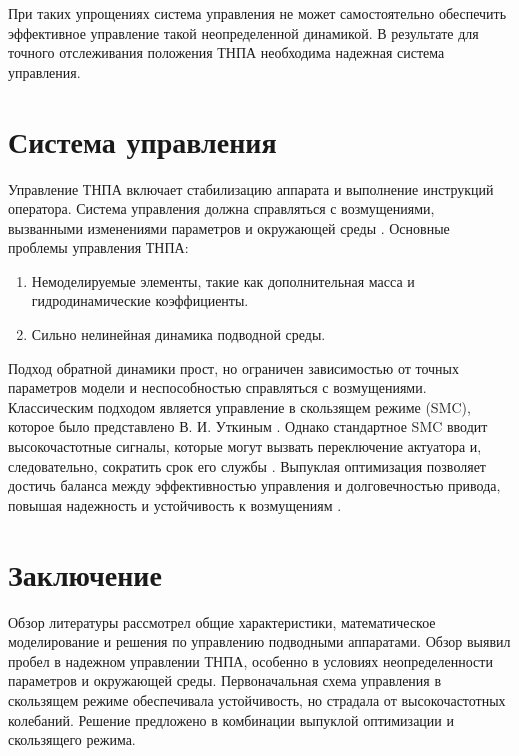    При таких упрощениях система управления не может самостоятельно обеспечить эффективное управление такой неопределенной динамикой. В результате для точного отслеживания положения ТНПА необходима надежная система управления.

\section{Система управления}

    Управление ТНПА включает стабилизацию аппарата и выполнение инструкций оператора. Система управления должна справляться с возмущениями, вызванными изменениями параметров и окружающей среды \cite{overview, control_overview}. Основные проблемы управления ТНПА:
    \begin{enumerate}
        \item Немоделируемые элементы, такие как дополнительная масса и гидродинамические коэффициенты.
        \item Сильно нелинейная динамика подводной среды.
    \end{enumerate}

    Подход обратной динамики \cite{spong_book} прост, но ограничен зависимостью от точных параметров модели и неспособностью справляться с возмущениями. Классическим подходом является управление в скользящем режиме (SMC), которое было представлено В. И. Уткиным \cite{utkin}. Однако стандартное SMC вводит высокочастотные сигналы, которые могут вызвать переключение актуатора и, следовательно, сократить срок его службы \cite{slotine, spong}. Выпуклая оптимизация позволяет достичь баланса между эффективностью управления и долговечностью привода, повышая надежность и устойчивость к возмущениям \cite{utkin_opt, utkin_book}.

\section{Заключение}

    Обзор литературы рассмотрел общие характеристики, математическое моделирование и решения по управлению подводными аппаратами. Обзор выявил пробел в надежном управлении ТНПА, особенно в условиях неопределенности параметров и окружающей среды. Первоначальная схема управления в скользящем режиме обеспечивала устойчивость, но страдала от высокочастотных колебаний. Решение предложено в комбинации выпуклой оптимизации и скользящего режима.